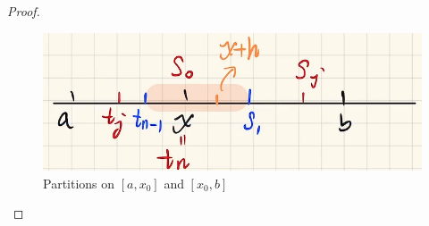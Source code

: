 \begin{proposition}
\begin{proof}
\begin{enumerate}
				\begin{figure}[thbp!]
					\centering
					\includegraphics[width=0.6\linewidth]{figure/4.4.3-1}
					\caption{Partitions on $[a , x_0]$ and $[x_0 , b]$}
					\label{pic : 4.4.3-1} %
				\end{figure}
			\end{enumerate}
		\end{proof}
	\end{proposition}




	\ifx\allfiles\undefined

\fi